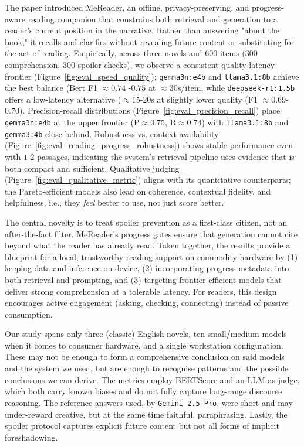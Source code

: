 The paper introduced MeReader, an offline, privacy-preserving, and progress-aware reading companion that constrains both retrieval and generation to a reader's current position in the narrative.
Rather than answering "about the book," it recalls and clarifies without revealing future content or substituting for the act of reading.
Empirically, across three novels and 600 items (300 comprehension, 300 spoiler checks), we observe a consistent quality-latency frontier (Figure~\ref{fig:eval_speed_quality}); \texttt{gemma3n:e4b} and \texttt{llama3.1:8b} achieve the best balance (Bert F1 $\approx 0.74$ -$0.75$ at $\approx 30$s/item, while \texttt{deepseek-r1:1.5b} offers a low-latency alternative ($\approx 15$-$20$s at slightly lower quality (F1 $\approx 0.69$-$0.70$).
Precision-recall distributions (Figure~\ref{fig:eval_precision_recall}) place \texttt{gemma3n:e4b} at the upper frontier (P$\approx0.75$, R$\approx0.74$) with \texttt{llama3.1:8b} and \texttt{gemma3:4b} close behind.
Robustness vs. context availability (Figure~\ref{fig:eval_reading_progress_robustness}) shows stable performance even with $1$-$2$ passages, indicating the system's retrieval pipeline uses evidence that is both compact and sufficient.
Qualitative judging (Figure~\ref{fig:eval_qualitative_metric}) aligns with its quantitative counterparts; the Pareto-efficient models also lead on coherence, contextual fidelity, and helpfulness, i.e., they \textit{feel} better to use, not just score better.

The central novelty is to treat spoiler prevention as a first-class citizen, not an after-the-fact filter.
MeReader's progress gates ensure that generation cannot cite beyond what the reader has already read.
Taken together, the results provide a blueprint for a local, trustworthy reading support on commodity hardware by (1) keeping data and inference on device, (2) incorporating progress metadata into both retrieval and prompting, and (3) targeting frontier-efficient models that deliver strong comprehension at a tolerable latency.
For readers, this design encourages active engagement (asking, checking, connecting) instead of passive consumption.

Our study spans only three (classic) English novels, ten small/medium models when it comes to consumer hardware, and a single workstation configuration.
These may not be enough to form a comprehensive conclusion on said models and the system we used, but are enough to recognise patterns and the possible conclusions we can derive.
The metrics employ BERTScore and an LLM-as-judge, which both carry known biases and do not fully capture long-range discourse reasoning.
The reference answers used, by \texttt{Gemini 2.5 Pro}, were short and may under-reward creative, but at the same time faithful, paraphrasing.
Lastly, the spoiler protocol captures explicit future content but not all forms of implicit foreshadowing.

